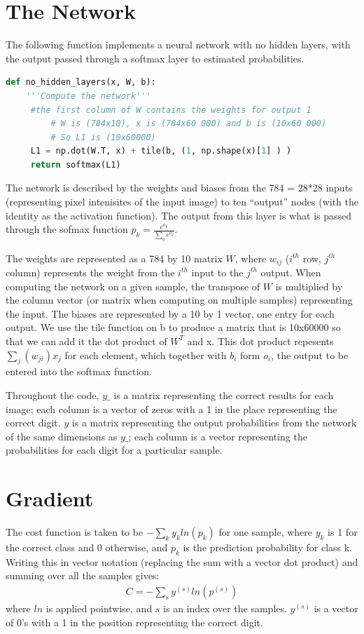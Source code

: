 \documentclass{article}
\begin{document}
   \section{The Network}
   The following function implements a neural network with no hidden layers, with the
   output passed through a softmax layer to estimated probabilities.

   \begin{lstlisting}[language=Python]
      def no_hidden_layers(x, W, b):
	'''Compute the network'''
   	 #the first column of W contains the weights for output 1
    	 # W is (784x10), x is (784x60 000) and b is (10x60 000)
    	 # So L1 is (10x60000)
   	 L1 = np.dot(W.T, x) + tile(b, (1, np.shape(x)[1] ) )
  	 return softmax(L1)
   \end{lstlisting}

   The network is described by the weights and biases from the 784 = 28*28 inputs
   (representing pixel intenisites of the input image) to ten ``output'' nodes
   (with the identity as the activation function). The output from this layer is what is
   passed through the sofmax function $p_k = \frac{ e^{o_k} }{ \sum_q e^{o_q}}$.

   The weights are represented as a 784 by 10 matrix $W$, where $w_{ij}$ ($i^{th}$ row, $j^{th}$
   column) represents the weight from the $i^{th}$ input to the $j^{th}$ output.
   When computing the network on a given sample, the transpose of $W$ is multiplied
   by the column vector (or matrix when computing on multiple samples) representing the input.
   The biases are represented by a 10 by 1 vector, one entry for each output. We use the tile function on 
   b to produce a matrix that is 10x60000 so that we can add it the dot product of $W^T $ and x. This dot product
  repesents $\sum_j ( w_{ji} ) x_j$ for each element, which together with $b_i$ form $o_i$, the output to be entered into the 
 softmax function.

   Throughout the code, $y\_$ is a matrix representing the correct results for each image; each column is a
   vector of zeros with a 1 in the place representing the correct digit.
   $y$ is a matrix representing the output probabilities from the network of the same dimensions
   as $y\_$; each column is a vector representing the probabilities for each digit for a
   particular sample.

   \section{Gradient}
   The cost function is taken to be $- \sum_{k} y_k ln(p_k)$ for one sample, where $y_k$ is
   1 for the correct class and 0 otherwise, and $p_k$ is the prediction probability for class k.
   Writing this in vector notation (replacing the sum with a vector dot product) and
   summing over all the samples gives:
      \begin{equation*} \begin{split}
         C = - \sum_{s} y^{(s)} ln(p^{(s)})
      \end{split} \end{equation*}
   where $ln$ is applied pointwise, and $s$ is an index over the samples. $y^{(s)}$ is
   a vector of 0's with a 1 in the position representing the correct digit.
\end{document}
